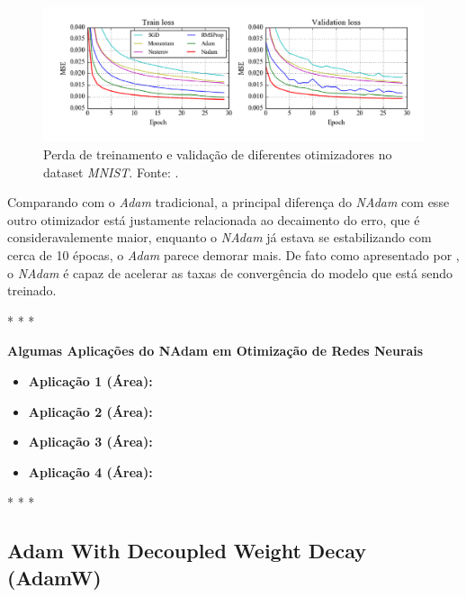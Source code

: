 \begin{figure}[h]
    \centering
    \includegraphics[width=1\linewidth]{../imagens/retropropagacao-gradiente/comparativo-nadam-mnist.png}
    
    \caption[Perda de treinamento e validação com diferentes otimizadores]{%
        Perda de treinamento e validação de diferentes otimizadores no dataset \textit{MNIST}.
        \newline
        \small Fonte: \parencite{NadamMethod}.
    }
    \label{fig:comparativo-nadam-mnist}
\end{figure}
 
Comparando com o \textit{Adam} tradicional, a principal diferença do \textit{NAdam} com esse outro otimizador está justamente relacionada ao decaimento do erro, que é consideravalemente maior, enquanto o \textit{NAdam} já estava se estabilizando com cerca de 10 épocas, o \textit{Adam} parece demorar mais. De fato como apresentado por \textcite{NadamMethod}, o \textit{NAdam} é capaz de acelerar as taxas de convergência do modelo que está sendo treinado.

\medskip
\begin{center}
 * * *
\end{center}
\medskip

\textbf{Algumas Aplicações do NAdam em Otimização de Redes Neurais}
\vspace{1em}

\begin{itemize}
    \item \textbf{Aplicação 1 (Área):}
    \item \textbf{Aplicação 2 (Área):}
    \item \textbf{Aplicação 3 (Área):}
    \item \textbf{Aplicação 4 (Área):}
\end{itemize}

\medskip
\begin{center}
 * * *
\end{center}
\medskip

\subsection{Adam With Decoupled Weight Decay (AdamW)} 

